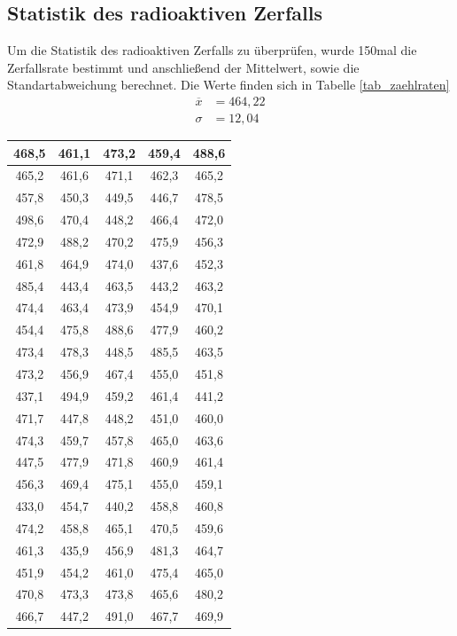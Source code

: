 \subsection{Statistik des radioaktiven Zerfalls}
Um die Statistik des radioaktiven Zerfalls zu überprüfen, wurde 150mal die Zerfallsrate bestimmt und anschließend der Mittelwert, sowie die Standartabweichung berechnet. Die Werte finden sich in Tabelle \ref{tab_zaehlraten}\\
\begin{align*}
\overline{x}&=464,22\\
\sigma&=12,04
\end{align*}

\begin{table}[H]
\begin{tabular}{|c|c|c|c|c|}
\hline 
468,5	&461,1	&473,2	&459,4	&488,6\\ \hline
465,2	&461,6	&471,1	&462,3	&465,2\\ \hline
457,8	&450,3	&449,5	&446,7	&478,5\\ \hline
498,6	&470,4	&448,2	&466,4	&472,0\\ \hline
472,9	&488,2	&470,2	&475,9	&456,3\\ \hline
461,8	&464,9	&474,0	&437,6	&452,3\\ \hline
485,4	&443,4	&463,5	&443,2	&463,2\\ \hline
474,4	&463,4	&473,9	&454,9	&470,1\\ \hline
454,4	&475,8	&488,6	&477,9	&460,2\\ \hline
473,4	&478,3	&448,5	&485,5	&463,5\\ \hline
473,2	&456,9	&467,4	&455,0	&451,8\\ \hline
437,1	&494,9	&459,2	&461,4	&441,2\\ \hline
471,7	&447,8	&448,2	&451,0	&460,0\\ \hline
474,3	&459,7	&457,8	&465,0	&463,6\\ \hline
447,5	&477,9	&471,8	&460,9	&461,4\\ \hline
456,3	&469,4	&475,1	&455,0	&459,1\\ \hline
433,0	&454,7	&440,2	&458,8	&460,8\\ \hline
474,2	&458,8	&465,1	&470,5	&459,6\\ \hline
461,3	&435,9	&456,9	&481,3	&464,7\\ \hline
451,9	&454,2	&461,0	&475,4	&465,0\\ \hline
470,8	&473,3	&473,8	&465,6	&480,2\\ \hline
466,7	&447,2	&491,0	&467,7	&469,9\\ \hline

\end{tabular}
\end{table}
